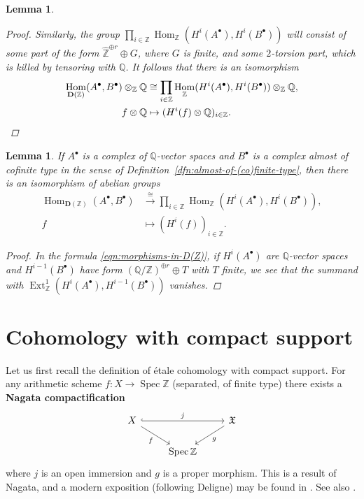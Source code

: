 \documentclass{article}
\DeclareMathOperator{\Ext}{Ext}
\DeclareMathOperator{\Hom}{Hom}
\DeclareMathOperator{\Spec}{Spec}
\newcommand{\QQ}{\mathbb{Q}}
\newcommand{\ZZ}{\mathbb{Z}}
\newtheorem{lemma}[theorem]{Lemma}
\theoremstyle{definition}
\numberwithin{equation}{section}
\begin{document}
\begin{appendices}
\begin{lemma}
\begin{proof}
    Similarly, the group
    $\prod_{i\in\ZZ} \Hom_\ZZ (H^i (A^\bullet), H^i (B^\bullet))$ will consist
    of some part of the form $\widehat{\ZZ}^{\oplus r} \oplus G$, where $G$
    is finite, and some $2$-torsion part, which is killed by tensoring with
    $\QQ$. It follows that there is an isomorphism
    \begin{align*}
      \Hom_{\mathbf{D} (\ZZ)} (A^\bullet, B^\bullet)\otimes_\ZZ \mathbb{Q} & \cong
      \prod_{i\in \mathbb{Z}} \Hom_\ZZ (H^i (A^\bullet), H^i (B^\bullet)) \otimes_\ZZ \mathbb{Q}, \\
      f\otimes\QQ & \mapsto (H^i (f) \otimes \QQ)_{i\in\ZZ}. \qedhere
    \end{align*}
  \end{proof}
\end{lemma}

\begin{lemma}
  \label{lemma:morphisms-in-DAb-between-cplx-of-Q-vs-and-almost-cofinite-type-cplx}
  If $A^\bullet$ is a complex of $\QQ$-vector spaces and $B^\bullet$ is a
  complex almost of cofinite type in the sense of
  Definition~\ref{dfn:almost-of-(co)finite-type}, then there is an isomorphism
  of abelian groups
  \begin{align*}
    \Hom_{\mathbf{D} (\ZZ)} (A^\bullet, B^\bullet) & \xrightarrow{\cong}
    \prod_{i\in \ZZ} \Hom_\ZZ (H^i (A^\bullet), H^i (B^\bullet)),\\
    f & \mapsto (H^i (f))_{i\in \ZZ}.
  \end{align*}

  \begin{proof}
    In the formula \eqref{eqn:morphisms-in-D(Z)}, if $H^i (A^\bullet)$ are
    $\QQ$-vector spaces and $H^{i-1} (B^\bullet)$ have form
    $(\QQ/\ZZ)^{\oplus r} \oplus T$ with $T$ finite, we see that the summand with
    $\Ext_\ZZ^1 (H^i (A^\bullet), H^{i-1} (B^\bullet))$ vanishes.
  \end{proof}
\end{lemma}


\pagebreak
\section{Cohomology with compact support}
\label{app:modified-cohomology-with-compact-support}

Let us first recall the definition of étale cohomology with compact support.
For any arithmetic scheme $f\colon X\to \Spec \ZZ$ (separated, of finite type)
there exists a \textbf{Nagata compactification}
\[ \begin{tikzcd}
X \ar[hookrightarrow]{rr}{j}\ar{dr}[swap]{f} & & \mathfrak{X} \ar{dl}{g} \\
 & \Spec \ZZ
\end{tikzcd} \]
where $j$ is an open immersion and $g$ is a proper morphism. This is a result of
Nagata, and a modern exposition (following Deligne) may be found in
\cite{Conrad-Deligne-Nagata,Conrad-Deligne-Nagata-erratum}. See also
\cite[Exposé~XVII]{SGA4}.


\end{appendices}
\end{document}

